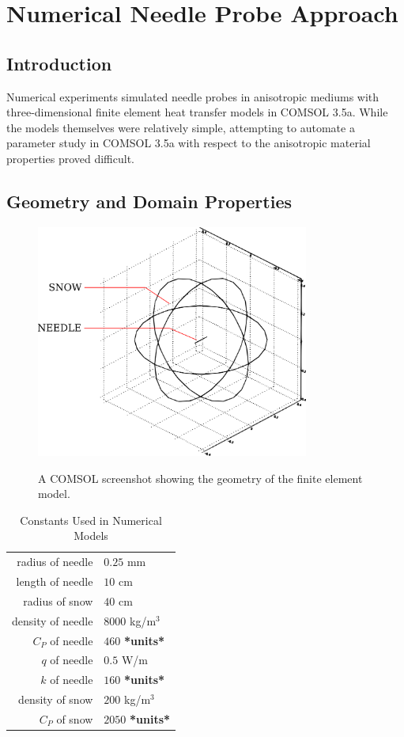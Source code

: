 \chapter{Numerical Needle Probe Approach}
\label{sec:numerical-np}
\bigskip

\section{Introduction} 
\label{sec:numerical-np:introduction}

Numerical experiments simulated needle probes in anisotropic mediums with
three-dimensional finite element heat transfer models in COMSOL 3.5a. While the
models themselves were relatively simple, attempting to automate a parameter
study in COMSOL 3.5a with respect to the anisotropic material properties proved
difficult.

\section{Geometry and Domain Properties}
\label{sec:numerical-np:domain}


\begin{figure}[h]
\centering
\includegraphics[width=0.8\textwidth]{fig/domain.png}
\label{fig:domain}
\caption{A COMSOL screenshot showing the geometry of the finite element model.}
\end{figure}


\begin{table}[h]
\label{tab:constants}
\centering
\caption{Constants Used in Numerical Models}
\begin{tabular}{r | l}
radius of needle & \(0.25\) mm\\
length of needle & \(10\) cm\\
radius of snow & \(40\) cm\\
\hline
density of needle & \(8000\) kg/\(\textrm{m}^3\)\\
\(C_P\) of needle & \(460\) \textbf{*units*}\\
\(q\) of needle & \(0.5\) W/m\\
\(k\) of needle & \(160\) \textbf{*units*}\\
\hline
density of snow & \(200\) kg/\(\textrm{m}^3\)\\
\(C_P\) of snow & \(2050\) \textbf{*units*}
\end{tabular}
\end{table}

